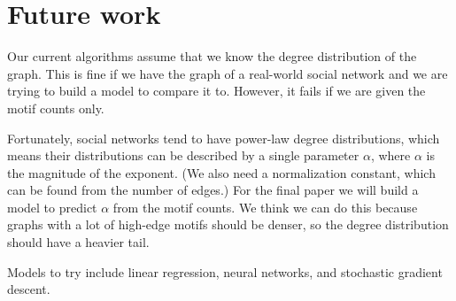 \section{Future work}
\label{sec:related}

Our current algorithms assume that we know the degree distribution of the graph.  This is fine if we have the graph of a real-world social network and we are trying to build a model to compare it to.  However, it fails if we are given the motif counts only.

Fortunately, social networks tend to have power-law degree distributions, which means their distributions can be described by a single parameter $\alpha$, where $\alpha$ is the magnitude of the exponent.  (We also need a normalization constant, which can be found from the number of edges.)  For the final paper we will build a model to predict $\alpha$ from the motif counts.  We think we can do this because graphs with a lot of high-edge motifs should be denser, so the degree distribution should have a heavier tail.

Models to try include linear regression, neural networks, and stochastic gradient descent.